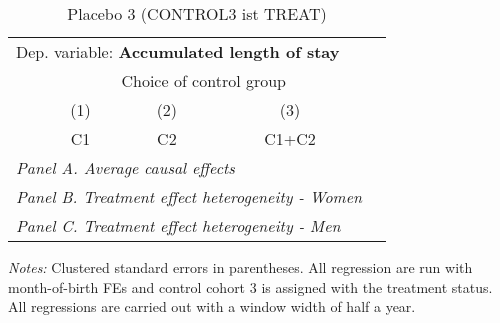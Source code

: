  \begin{table}[H] \centering \begin{threeparttable} \caption{Placebo 3 (CONTROL3 ist TREAT) } {\def\sym#1{\ifmmode^{#1}\else\(^{#1}\)\fi} \begin{tabular}{l*{4}{c}} \toprule \multicolumn{4}{l}{Dep. variable: \textbf{Accumulated length of stay}} \\ & \multicolumn{3}{c}{Choice of control group} \\ \cmidrule(lr){2-4}
            &\multicolumn{1}{c}{(1)}&\multicolumn{1}{c}{(2)}&\multicolumn{1}{c}{(3)}\\
            &\multicolumn{1}{c}{C1}&\multicolumn{1}{c}{C2}&\multicolumn{1}{c}{C1+C2}\\
\midrule
 \multicolumn{4}{l}{\emph{Panel A. Average causal effects}} \\      \midrule\multicolumn{4}{l}{\emph{Panel B. Treatment effect heterogeneity - Women}} \\      \midrule\multicolumn{4}{l}{\emph{Panel C. Treatment effect heterogeneity - Men}} \\      
\bottomrule \end{tabular} } \begin{tablenotes} \item \scriptsize \emph{Notes:} Clustered standard errors in parentheses. All regression are run with month-of-birth FEs and control cohort 3 is assigned with the treatment status. All regressions are carried out with a window width of half a year. \end{tablenotes} \end{threeparttable} \end{table} 
